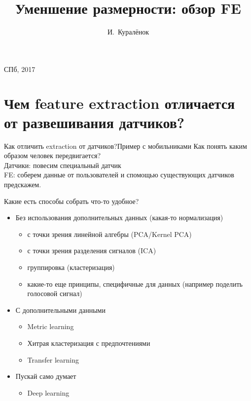 \documentclass[14pt, fleqn, xcolor={dvipsnames, table}]{beamer}
\title{Уменшение размерности: обзор FE\\\small{}}
\author[]{\small{%
И.~Куралёнок}}
\date{}
\begin{document}
\begin{frame}
\maketitle
\small
\begin{center}
\vspace{-60pt}
\vspace{80pt}
\footnotesize СПб, 2017
\end{center}
\end{frame}
\section{Чем feature extraction отличается от развешивания датчиков?}

\begin{frame}{Как отличить extraction от датчиков?}{Пример с мобильниками}
Как понять каким образом человек передвигается?\\
{\color{blue} Датчики:} повесим специальный датчик \\
{\color{blue} FE:} соберем данные от пользователей и спомощью существующих датчиков предскажем.
\end{frame}

\begin{frame}{Какие есть способы собрать что-то удобное?}
\small
\begin{itemize}
  \item Без использования дополнительных данных (какая-то нормализация)
  \begin{itemize}
    \footnotesize
    \item с точки зрения линейной алгебры (PCA/Kernel PCA)
    \item с точки зрения разделения сигналов (ICA)
    \item группировка (кластеризация)
    \item какие-то еще принципы, специфичные для данных (например поделить голосовой сигнал)
  \end{itemize}
  \item С дополнительными данными
  \begin{itemize}
    \footnotesize
    \item Metric learning
    \item Хитрая кластеризация с предпочтениями
    \item Transfer learning
  \end{itemize}
  \item Пускай само думает
  \begin{itemize}
    \footnotesize
    \item Deep learning
  \end{itemize}
\end{itemize}
\end{frame}
\end{document}
